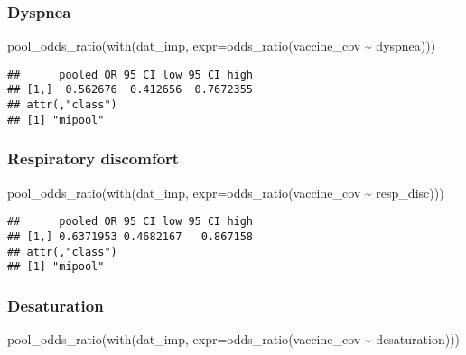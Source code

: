 \documentclass[
]{article}
\newenvironment{Shaded}{\begin{snugshade}}{\end{snugshade}}
\newcommand{\AttributeTok}[1]{\textcolor[rgb]{0.77,0.63,0.00}{#1}}
\newcommand{\FunctionTok}[1]{\textcolor[rgb]{0.00,0.00,0.00}{#1}}
\newcommand{\NormalTok}[1]{#1}
\newcommand{\SpecialCharTok}[1]{\textcolor[rgb]{0.00,0.00,0.00}{#1}}
\begin{document}
\hypertarget{dyspnea-1}{%
\subsubsection{Dyspnea}\label{dyspnea-1}}

\begin{Shaded}
\begin{Highlighting}[]
\FunctionTok{pool\_odds\_ratio}\NormalTok{(}\FunctionTok{with}\NormalTok{(dat\_imp, }\AttributeTok{expr=}\FunctionTok{odds\_ratio}\NormalTok{(vaccine\_cov }\SpecialCharTok{\textasciitilde{}}\NormalTok{ dyspnea))) }
\end{Highlighting}
\end{Shaded}

\begin{verbatim}
##      pooled OR 95 CI low 95 CI high
## [1,]  0.562676  0.412656  0.7672355
## attr(,"class")
## [1] "mipool"
\end{verbatim}

\hypertarget{respiratory-discomfort-1}{%
\subsubsection{Respiratory discomfort}\label{respiratory-discomfort-1}}

\begin{Shaded}
\begin{Highlighting}[]
\FunctionTok{pool\_odds\_ratio}\NormalTok{(}\FunctionTok{with}\NormalTok{(dat\_imp, }\AttributeTok{expr=}\FunctionTok{odds\_ratio}\NormalTok{(vaccine\_cov }\SpecialCharTok{\textasciitilde{}}\NormalTok{ resp\_disc))) }
\end{Highlighting}
\end{Shaded}

\begin{verbatim}
##      pooled OR 95 CI low 95 CI high
## [1,] 0.6371953 0.4682167   0.867158
## attr(,"class")
## [1] "mipool"
\end{verbatim}

\hypertarget{desaturation-1}{%
\subsubsection{Desaturation}\label{desaturation-1}}

\begin{Shaded}
\begin{Highlighting}[]
\FunctionTok{pool\_odds\_ratio}\NormalTok{(}\FunctionTok{with}\NormalTok{(dat\_imp, }\AttributeTok{expr=}\FunctionTok{odds\_ratio}\NormalTok{(vaccine\_cov }\SpecialCharTok{\textasciitilde{}}\NormalTok{ desaturation))) }
\end{Highlighting}
\end{Shaded}
\end{document}
